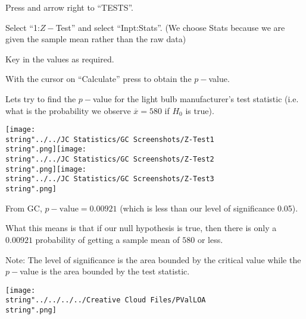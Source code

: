 \documentclass[11pt,a4paper]{book}
\begin{document}
\begin{steps}[leftmargin=1.5cm]

\item  Press \tcbox[box align=base,nobeforeafter,colback=black, colframe=black,size=small]{\textbf{\textcolor{white}{stat}}}
and arrow right to ``TESTS''.

\item  Select ``1:$Z-$Test'' and select ``Inpt:Stats''. (We
choose Stats because we are given the sample mean rather than the
raw data)

\item  Key in the values as required.

\item  With the cursor on ``Calculate'' press \tcbox[box align=base,nobeforeafter,colback=white, colframe=black,size=small]{\textbf{\textcolor{black}{enter}}}
to obtain the $p-$value.

\end{steps}

Lets try to find the $p-$value for the light bulb manufacturer's
test statistic (i.e. what is the probability we observe $\overline{x}=580$
if $H_{0}$ is true).
\begin{center}
\texttt{[image: \\string"../../JC Statistics/GC Screenshots/Z-Test1\\string".png]}\hspace{1cm}\texttt{[image: \\string"../../JC Statistics/GC Screenshots/Z-Test2\\string".png]}\hspace{1cm}\texttt{[image: \\string"../../JC Statistics/GC Screenshots/Z-Test3\\string".png]}
\par\end{center}

From GC, $p-\text{value}=0.00921$ (which is less than our level of
significance 0.05).

What this means is that if our null hypothesis is true, then there
is only a $0.00921$ probability of getting a sample mean of $580$
or less.

\medskip


\medskip

Note: The level of significance is the area bounded by the critical
value while the $p-$value is the area bounded by the test statistic.
\begin{center}
\texttt{[image: \\string"../../../../Creative Cloud Files/PValLOA\\string".png]}
\par\end{center}
\end{document}
